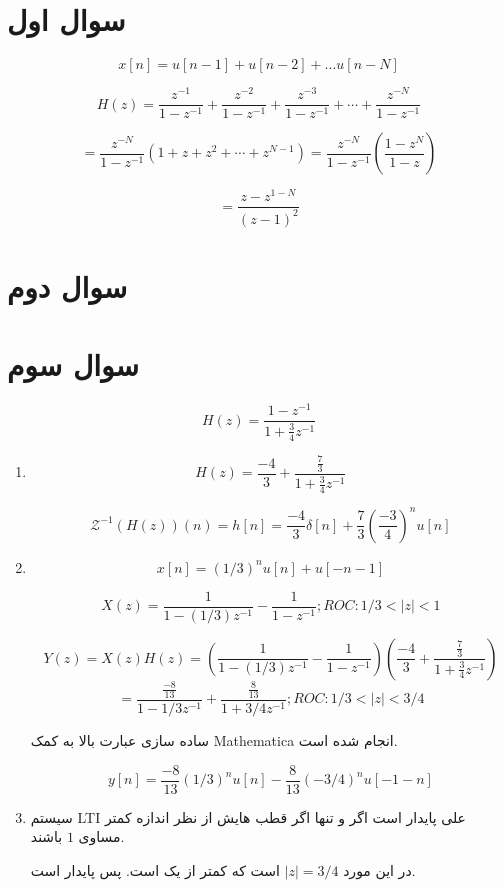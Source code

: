 \documentclass[12pt]{article}
\begin{document}
\KashidaOff

\section{سوال اول}



$$x[n] =  u[n-1] + u[n-2] + ... u[n-N]$$

$$H(z) = \frac{z^{-1}}{1 - z^{-1}} + \frac{z^{-2}}{1 - z^{-1}} + \frac{z^{-3}}{1 - z^{-1}} + \cdots + \frac{z^{-N}}{1 - z^{-1}}$$

$$= \frac{z^{-N}}{1 -z^{-1}}(1+z+z^2 + \cdots + z^{N-1}) = \frac{z^{-N}}{1 -z^{-1}} (\frac{1-z^N}{1-z})$$

$$=\frac{z-z^{1-N}}{(z-1)^2}$$

\section{سوال دوم}


\section{سوال سوم}

$$
H(z)=\frac{1-z^{-1}}{1+\frac{3}{4} z^{-1}}
$$

\begin{enumerate}[label = \Alph*)]
	\item 
	$$H(z) = \frac{-4}{3} + \frac{\frac{7}{3}}{1 + \frac{3}{4} z^{-1}}$$
	
	$$\mathcal{Z}^{-1}(H(z))(n) = h[n] = \frac{-4}{3} \delta[n] + \frac{7}{3} (\frac{-3}{4})^n u[n]$$ 
	
	\item
	
	$$x[n] = (1/3)^n u[n] + u[-n -1]$$
	
	$$X(z) = \frac{1}{1 - (1/3) z^{-1}} - \frac{1}{1 - z^{-1}}; ROC: 1/3<|z|<1$$
	
	$$Y(z) = X(z) H(z) = (\frac{1}{1 - (1/3) z^{-1}} - \frac{1}{1 - z^{-1}}) (\frac{-4}{3} + \frac{\frac{7}{3}}{1 + \frac{3}{4} z^{-1}})$$$$ = \frac{\frac{-8}{13}}{1 - 1/3 z^{-1}} + \frac{\frac{8}{13}}{1 + 3/4 z^{-1}} ; ROC: 1/3<|z| < 3/4$$
	
	ساده سازی عبارت بالا به کمک Mathematica انجام شده است.
	
	$$y[n] = \frac{-8}{13} (1/3)^n u[n] - \frac{8}{13} (-3/4)^{n} u[-1-n] $$
	
	
	\item
	سیستم LTI علی پایدار است اگر و تنها اگر قطب هایش از نظر اندازه کمتر مساوی $1$ باشند.
	
	در این مورد $|z| = 3/4$ است که کمتر از یک است. پس پایدار است.
	
	
	
\end{enumerate}
\end{document}
